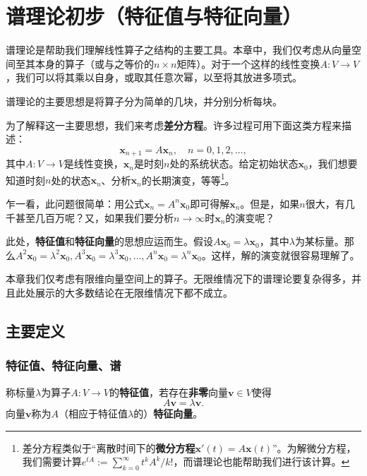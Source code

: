 

\chapter{谱理论初步（特征值与特征向量）}\label{chap:SpectralIntro}

谱理论是帮助我们理解线性算子之结构的主要工具。本章中，我们仅考虑从向量空间至其本身的算子（或与之等价的$n\times n$矩阵）。对于一个这样的线性变换$A:V\to V$，我们可以将其乘以自身，或取其任意次幂，以至将其放进多项式。

谱理论的主要思想是将算子分为简单的几块，并分别分析每块。

为了解释这一主要思想，我们来考虑{\bf 差分方程}。许多过程可用下面这类方程来描述：\[\mathbf{x}_{n+1}=A\mathbf{x}_{n},\quad n=0,1,2,\ldots,\]
其中$A:V\to V$是线性变换，$\mathbf{x}_n$是时刻$n$处的系统状态。给定初始状态$\mathbf{x}_{0}$，我们想要知道时刻$n$处的状态$\mathbf{x}_n$、分析$\mathbf{x}_n$的长期演变，等等\footnote{差分方程类似于“离散时间下的\textbf{微分方程}$\mathbf{x}'(t)=A\mathbf{x}(t)$”。为解微分方程，我们需要计算$e^{tA}:=\sum_{k=0}^{\infty}t^{k}A^{k}/k!$，而谱理论也能帮助我们进行该计算。}。

乍一看，此问题很简单：用公式$\mathbf{x}_n=A^n\mathbf{x}_0$即可得解$\mathbf{x}_n$。但是，如果$n$很大，有几千甚至几百万呢？又，如果我们要分析$n\to\infty$时$\mathbf{x}_n$的演变呢？

此处，{\bf 特征值}和{\bf 特征向量}的思想应运而生。假设$A\mathbf{x}_{0}=\lambda\mathbf{x}_{0}$，其中$\lambda$为某标量。那么$A^{2}\mathbf{x}_{0}=\lambda^{2}\mathbf{x}_{0},A^{3}\mathbf{x}_{0}=\lambda^{3}\mathbf{x}_{0},\ldots,A^n\mathbf{x}_0=\lambda^n\mathbf{x}_0$。这样，解的演变就很容易理解了。

本章我们仅考虑有限维向量空间上的算子。无限维情况下的谱理论要复杂得多，并且此处展示的大多数结论在无限维情况下都不成立。

\section{主要定义}

\subsection{特征值、特征向量、谱}

称标量$\lambda$为算子$A:V\to V$的\textbf{特征值}，若存在\textbf{非零}向量$\mathbf{v}\in V$使得\[A\mathbf{v}=\lambda\mathbf{v}.\]
向量$\mathbf{v}$称为$A$（相应于特征值$\lambda$的）\textbf{特征向量}。

